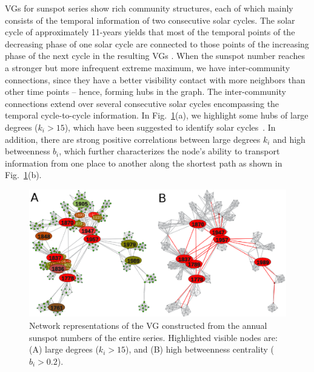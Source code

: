 		VGs for sunspot series show rich community structures, each of which mainly consists of the temporal information of two consecutive solar cycles. The solar cycle of approximately 11-years yields that most of the temporal points of the decreasing phase of one solar cycle are connected to those points of the increasing phase of the next cycle in the resulting VGs \cite{Zou2014a}. When the sunspot number reaches a stronger but more infrequent extreme maximum, we have inter-community connections, since they have a better visibility contact with more neighbors than other time points -- hence, forming hubs in the graph. The inter-community connections extend over several consecutive solar cycles encompassing the temporal cycle-to-cycle information. In Fig.~\ref{year_sspnDegBet}(a), we highlight some hubs of large degrees ($k_i > 15$), which have been suggested to identify solar cycles~\cite{Zou2014a}. In addition, there are strong positive correlations between large degrees $k_i$ and high betweenness $b_i$, which further characterizes the node's ability to transport information from one place to another along the shortest path as shown in Fig.~\ref{year_sspnDegBet}(b). 
		\begin{figure}
  		\centering
   			\includegraphics[width=\columnwidth]{Chapter07_Applications/network261_degree_between.eps}
			\caption{Network representations of the VG constructed from the annual sunspot numbers of the entire series. Highlighted visible nodes are: (A) large degrees ($k_i>15$), and (B) high betweenness centrality ($b_i>0.2$). } \label{year_sspnDegBet}
		\end{figure}


